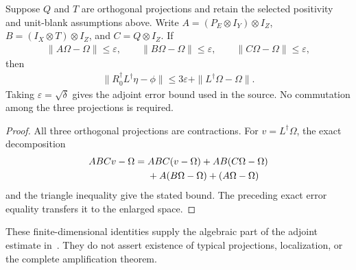 \begin{theorem}
    \label{thm:restoring_three_projection_error}
    \leanok
    Suppose $Q$ and $T$ are orthogonal projections and retain the selected
    positivity and unit-blank assumptions above. Write
    $A=(P_E\otimes I_Y)\otimes I_Z$,
    $B=(I_X\otimes T)\otimes I_Z$, and $C=Q\otimes I_Z$.
    If
    \begin{align}
        \|A\Omega-\Omega\|\le\varepsilon,\qquad
        \|B\Omega-\Omega\|\le\varepsilon,\qquad
        \|C\Omega-\Omega\|\le\varepsilon,
    \end{align}
    then
    \begin{align}
        \|R_0^\dagger L^\dagger\eta-\phi\|
        \le 3\varepsilon+\|L^\dagger\Omega-\Omega\|.
    \end{align}
    Taking $\varepsilon=\sqrt\delta$ gives the adjoint error bound used
    in the source. No commutation among the three projections is required.
\end{theorem}
\begin{proof}\leanok
    All three orthogonal projections are contractions. For $v=L^\dagger\Omega$,
    the exact decomposition
    \begin{align}
        ABCv-\Omega={}&ABC(v-\Omega)+AB(C\Omega-\Omega)\notag\\
          &+A(B\Omega-\Omega)+(A\Omega-\Omega)
    \end{align}
    and the triangle inequality give the stated bound. The preceding exact
    error equality transfers it to the enlarged space.
\end{proof}

These finite-dimensional identities supply the algebraic part of the
adjoint estimate in~\cite{OpenAI2026AreaLaw}. They do not assert existence
of typical projections, localization, or the complete amplification theorem.

